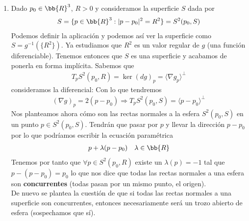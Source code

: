 \begin{ejemplo}
\begin{enumerate}
\begin{enumerate}
            De esta forma hemos probado que todas las rectas normales a un plano son paralelas. Esto deja abierta la pregunta de si una superficie con todas sus rectas normales paralelas es necesariamente un plano (o un trozo abierto de plano). Probablemente esto sea verdad.
        \end{enumerate}
        \item Dado $p_0\in \bb{R}^3$, $R>0$ y consideramos la superficie $S$ dada por 
        \begin{gather*}
            S = \{p\in \bb{R}^3 : |p-p_0|^2 = R^2\} = S^2(p_0, S)
        \end{gather*}
        Podemos definir la aplicación 
        y podemos así ver la superficie como $S=g^{-1}(\{R^2\})$. Ya estudiamos que $R^2$ es un valor regular de $g$ (una función diferenciable). Tenemos entonces que $S$ es una superficie y acabamos de ponerla en forma implícita. Sabemos que 
        \begin{gather*}
            T_pS^2(p_0, R) = \ker(dg)_p = \langle \nabla g_p \rangle^{\bot}
        \end{gather*}
        consideramos la diferencial:
        Con lo que tendremos 
        \begin{gather*}
            (\nabla g)_p = 2(p-p_0) \Rightarrow T_pS^2(p_0, S) = \langle p-p_0\rangle ^{\bot}
        \end{gather*}
        Nos planteamos ahora cómo son las rectas normales a la esfera $S^2(p_0, S)$ en un punto $p\in S^2(p_0, S)$. Tendrán que pasar por $p$ y llevar la dirección $p-p_0$ por lo que podríamos escribir la ecuación paramétrica
        \begin{gather*}
            p+ \lambda (p-p_0) \ \ \ \lambda \in \bb{R}
        \end{gather*}
        Tenemos por tanto que $\forall p \in S^2(p_0, R)$ existe un $\lambda(p)=-1$ tal que $p-(p-p_0) = p_0$ lo que nos dice que todas las rectas normales a una esfera son \textbf{concurrentes} (todas pasan por un mismo punto, el origen). \\

        De nuevo se plantea la cuestión de que si todas las rectas normales a una superficie son concurrentes, entonces necesariamente será un trozo abierto de esfera (sospechamos que sí).


\end{enumerate}
\end{ejemplo}
